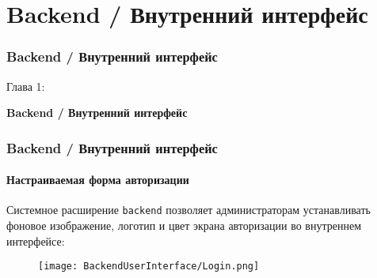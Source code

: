 %

\section{Backend / Внутренний интерфейс}
\begin{frame}[fragile]
	\frametitle{Backend / Внутренний интерфейс}

	\begin{center}\huge{Глава 1:}\end{center}
	\begin{center}\huge{\color{typo3darkgrey}\textbf{Backend / Внутренний интерфейс}}\end{center}

\end{frame}

\begin{frame}[fragile]
	\frametitle{Backend / Внутренний интерфейс}
	\framesubtitle{Настраиваемая форма авторизации}

	Системное расширение \texttt{backend} позволяет администраторам устанавливать
	фоновое изображение, логотип и цвет экрана авторизации во внутреннем интерфейсе:

	\begin{figure}
		\texttt{[image: BackendUserInterface/Login.png]}
	\end{figure}

\end{frame}

